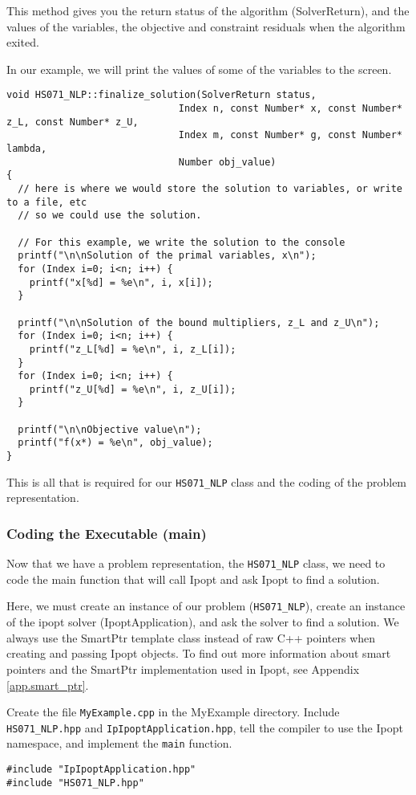 \documentclass[letter,10pt]{article}
\begin{document}
{This method gives you the return status of the algorithm
(SolverReturn), and the values of the variables, 
the objective and constraint residuals when the algorithm exited.

In our example, we will print the values of some of the variables to 
the screen.

\begin{verbatim}
void HS071_NLP::finalize_solution(SolverReturn status,
                              Index n, const Number* x, const Number* z_L, const Number* z_U,
                              Index m, const Number* g, const Number* lambda,
                              Number obj_value)
{
  // here is where we would store the solution to variables, or write to a file, etc
  // so we could use the solution. 

  // For this example, we write the solution to the console
  printf("\n\nSolution of the primal variables, x\n");
  for (Index i=0; i<n; i++) {
    printf("x[%d] = %e\n", i, x[i]); 
  }

  printf("\n\nSolution of the bound multipliers, z_L and z_U\n");
  for (Index i=0; i<n; i++) {
    printf("z_L[%d] = %e\n", i, z_L[i]); 
  }
  for (Index i=0; i<n; i++) {
    printf("z_U[%d] = %e\n", i, z_U[i]); 
  }

  printf("\n\nObjective value\n");
  printf("f(x*) = %e\n", obj_value); 
}
\end{verbatim}

This is all that is required for our {\tt HS071\_NLP} class and 
the coding of the problem representation.
 
\subsubsection{Coding the Executable (main)}
Now that we have a problem representation, the {\tt HS071\_NLP} class,
we need to code the main function that will call Ipopt and ask Ipopt
to find a solution.

Here, we must create an instance of our problem ({\tt HS071\_NLP}), create an
instance of the ipopt solver (IpoptApplication), and ask the solver to
find a solution. We always use the SmartPtr template class instead of
raw C++ pointers when creating and passing Ipopt objects. To find out
more information about smart pointers and the SmartPtr implementation
used in Ipopt, see Appendix \ref{app.smart_ptr}.

Create the file {\tt MyExample.cpp} in the MyExample directory.
Include {\tt HS071\_NLP.hpp} and {\tt IpIpoptApplication.hpp}, tell
the compiler to use the Ipopt namespace, and implement the {\tt main}
function.
\begin{verbatim}
#include "IpIpoptApplication.hpp"
#include "HS071_NLP.hpp"


\end{verbatim}}
\end{document}

